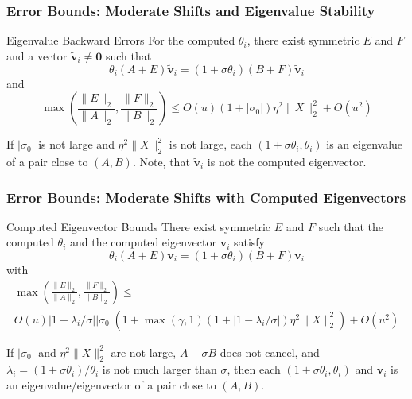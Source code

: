 \documentclass[landscape]{beamer}
\renewcommand{\vec}[1]{\bm{#1}}
\begin{document}
\begin{frame}
  \frametitle{Error Bounds: Moderate Shifts and Eigenvalue Stability}

  \begin{block}{Eigenvalue Backward Errors}
    For the computed $\theta_i$, there exist symmetric $E$ and $F$ and
    a vector $\tilde{\vec{v}}_i\neq \vec{0}$ such that
    \begin{equation*}
      \theta_i (A+E) \tilde{\vec{v}}_i = (1+\sigma \theta_i) (B+F) \tilde{\vec{v}}_i
    \end{equation*}
    and
    \begin{equation*}
      \max\left(\frac{\|E\|_2}{\|A\|_2}, \frac{\|F\|_2}{\|B\|_2}\right) \leq 
      O(u) (1+|\sigma_0|) \eta^2 \|X\|_2^2 + O(u^2)
    \end{equation*}
  \end{block}

  If $|\sigma_0|$ is not large and $\eta^2 \|X\|_2^2$ is not large, each
  $(1+\sigma \theta_i, \theta_i)$ is an eigenvalue of a pair close to $(A,B)$. Note, that $\tilde{\vec{v}}_i$ is not the computed eigenvector.
\end{frame}

\begin{frame}
  \frametitle{Error Bounds: Moderate Shifts with Computed Eigenvectors}

  \begin{block}{Computed Eigenvector Bounds}
    There exist symmetric
    $E$ and $F$ such that the computed $\theta_i$ and the computed
    eigenvector $\vec{v}_i$ satisfy
    \begin{equation*}
      \theta_i (A+E) \vec{v}_i = (1+\sigma \theta_i) (B+F) \vec{v}_i
    \end{equation*}
    with
    \begin{multline*}
      \max\left(\frac{\|E\|_2}{\|A\|_2}, \frac{\|F\|_2}{\|B\|_2}\right) \leq \\
      O(u) |1-\lambda_i/\sigma| |\sigma_0| \left(1 + \max(\gamma,1)
      \left(1+ |1-\lambda_i/\sigma|\right)\eta^2\|X\|_2^2\right) +O(u^2)
    \end{multline*}
  \end{block}
  
  If $|\sigma_0|$ and $\eta^2 \|X\|_2^2$ are not large, $A-\sigma B$
  does not cancel, and $\lambda_i = (1+\sigma\theta_i)/\theta_i$ is
  not much larger than $\sigma$, then each
  $(1+\sigma \theta_i, \theta_i)$ and $\vec{v}_i$ is an
  eigenvalue/eigenvector of a pair close to $(A,B)$.
\end{frame}
\end{document}
